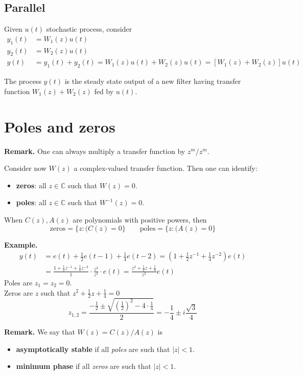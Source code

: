 \documentclass[10pt,a4paper,twoside,openright]{book}
\begin{document}
\subsection{Parallel}
Given $u(t)$ stochastic process, consider
\begin{align*}
	y_{1}(t)&=W_{1}(z)u(t)\\
	y_{2}(t)&=W_{2}(z)u(t)\\
	y(t)&=y_{1}(t)+y_{2}(t)=W_{1}(z)u(t)+W_{2}(z)u(t)=[W_{1}(z)+W_{2}(z)]u(t)
\end{align*}
\begin{theorem}
	The process $y(t)$ is the steady state output of a new filter having transfer function $W_{1}(z)+W_{2}(z)$ fed by $u(t)$.
\end{theorem}

\section{Poles and zeros}

\textbf{Remark.}
One can always multiply a transfer function by $z^{m}/z^{m}$.

Consider now $W(z)$ a complex-valued transfer function. Then one can identify:
\begin{itemize}
	\item \textbf{zeros}: all $z\in \mathbb{C}$ such that $W(z)=0$.
	\item \textbf{poles}: all $z\in \mathbb{C}$ such that $W^{-1} (z)=0$.
\end{itemize}
When $C(z),A(z)$ are polynomials with positive powers, then
\[
	\text{zeros}=\{z:(C(z)=0\} \qquad \text{poles}=\{z:(A(z)=0\}
\]

\textbf{Example.}
\begin{align*}
y(t) &=e(t)+\frac{1}{2} e(t-1)+\frac{1}{4} e(t-2) =\left(1+\frac{1}{2} z^{-1}+\frac{1}{4} z^{-2}\right) e(t) \\
&=\frac{1+\frac{1}{2} z^{-1}+\frac{1}{4} z^{-2}}{1} \cdot \frac{z^{2}}{z^{2}}\cdot e(t) =\frac{z^{2}+\frac{1}{2} z+\frac{1}{4}}{z^{2}} e(t)
\end{align*}
Poles are $z_{1}=z_{2}=0$.\\
Zeros are $z$ such that $z^{2}+\frac{1}{2} z+\frac{1}{4}=0$
\[
	z_{1,2}=\frac{-\frac{1}{2} \pm \sqrt{\left( \frac{1}{2}  \right) ^2 -4\cdot\frac{1}{4} } }{2} = -\frac{1}{4}\pm i\frac{\sqrt{3} }{4}
\]

\textbf{Remark.}
We say that $W(z)=C(z)/A(z)$ is
\begin{itemize}
	\item \textbf{asymptotically stable} if all \emph{poles} are such that $|z|<1$.
	\item \textbf{minimum phase} if all \emph{zeros} are such that $|z|<1$.
\end{itemize}
\end{document}
